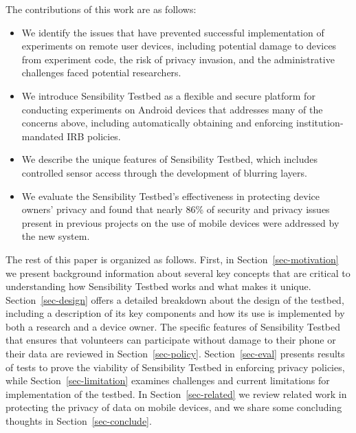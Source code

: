 The contributions of this work are as follows:

\begin{itemize}\setlength\itemsep{0em}
\item We identify the issues that have prevented successful implementation
of experiments on remote user devices, including potential damage to
devices from experiment code, the risk of privacy invasion, and the
administrative challenges faced potential researchers. 

\item We introduce Sensibility Testbed as a flexible and secure platform for
conducting experiments on Android devices that addresses many of the
concerns above, including automatically obtaining and enforcing 
institution-mandated IRB policies.

\item We describe the unique features of Sensibility Testbed, which includes 
controlled sensor access through the development of blurring layers.

\item We evaluate the Sensibility Testbed's effectiveness in
protecting device owners' privacy and found that nearly 86\% of
security and privacy issues present in previous projects on the use of
mobile devices were addressed by the new system.
\end{itemize}

The rest of this paper is organized as follows. First, in Section~\ref{sec-motivation} we
present background information about several key concepts that are
critical to understanding how Sensibility Testbed works and what makes
it unique. Section~\ref{sec-design} offers a detailed breakdown about the design of
the testbed, including a description of its key components and how its
use is implemented by both a research and a device owner. The specific
features of Sensibility Testbed that ensures that volunteers can
participate without damage to their phone or their data are reviewed
in Section~\ref{sec-policy}. Section~\ref{sec-eval} presents results of tests to prove the
viability of Sensibility Testbed in enforcing privacy policies, while
Section~\ref{sec-limitation} examines challenges and current limitations for
implementation of the testbed. In Section~\ref{sec-related} we review related work
in protecting the privacy of data on mobile devices, and we share some
concluding thoughts in Section~\ref{sec-conclude}.

